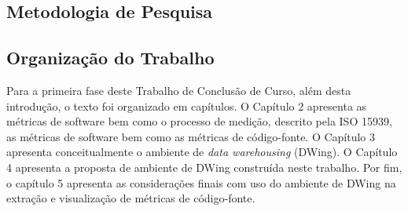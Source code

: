 
\subsection {Metodologia de Pesquisa}

\subsection{Organização do Trabalho}
Para a primeira fase deste Trabalho de Conclusão de Curso, além desta 
introdução, o texto foi organizado em capítulos. O Capítulo 2 apresenta as 
métricas de software bem como o processo de medição, descrito pela ISO 15939, 
as métricas de software bem como as métricas de código-fonte. O Capítulo 3 
apresenta conceitualmente o ambiente de \textit{data warehousing} (DWing). O 
Capítulo 4 apresenta a proposta de ambiente de DWing construída neste 
trabalho. Por fim, o capítulo 5 apresenta as considerações finais com uso do 
ambiente de DWing na extração e visualização de métricas de código-fonte. 
